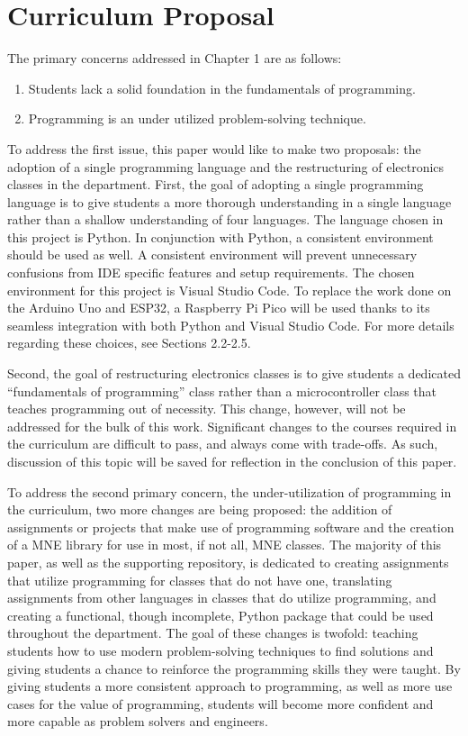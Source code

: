 \section{Curriculum Proposal}

The primary concerns addressed in Chapter 1 are as follows:

\begin{enumerate}
    \item Students lack a solid foundation in the fundamentals of programming.
    \item Programming is an under utilized problem-solving technique.
\end{enumerate}
To address the first issue, this paper would like to make two proposals: the adoption of a single programming 
language and the restructuring of electronics classes in the department. First, the goal of adopting a single 
programming language is to give students a more thorough understanding in a single language rather than 
a shallow understanding of four languages. The language chosen in this project is Python. In conjunction with 
Python, a consistent environment should be used as well. A consistent environment will prevent unnecessary 
confusions from IDE specific features and setup requirements. The chosen environment for this project is 
Visual Studio Code. To replace the work done on the Arduino Uno and ESP32, a Raspberry Pi Pico will be used 
thanks to its seamless integration with both Python and Visual Studio Code. For more details regarding these 
choices, see Sections 2.2-2.5.

Second, the goal of restructuring electronics classes is to give students a dedicated ``fundamentals of 
programming'' class rather than a microcontroller class that teaches programming out of necessity. This
change, however, will not be addressed for the bulk of this work. Significant changes to the courses
required in the curriculum are difficult to pass, and always come with trade-offs. As such, discussion of 
this topic will be saved for reflection in the conclusion of this paper.

To address the second primary concern, the under-utilization of programming in the curriculum, two more
changes are being proposed: the addition of assignments or projects that make use of programming software
and the creation of a MNE library for use in most, if not all, MNE classes. The majority of this paper, as
well as the supporting repository, is dedicated to creating assignments that utilize programming for classes
that do not have one, translating assignments from other languages in classes that do utilize programming,
and creating a functional, though incomplete, Python package that could be used throughout the department.
The goal of these changes is twofold: teaching students how to use modern problem-solving techniques to find 
solutions and giving students a chance to reinforce the programming skills they were taught. By giving
students a more consistent approach to programming, as well as more use cases for the value of programming,
students will become more confident and more capable as problem solvers and engineers.

